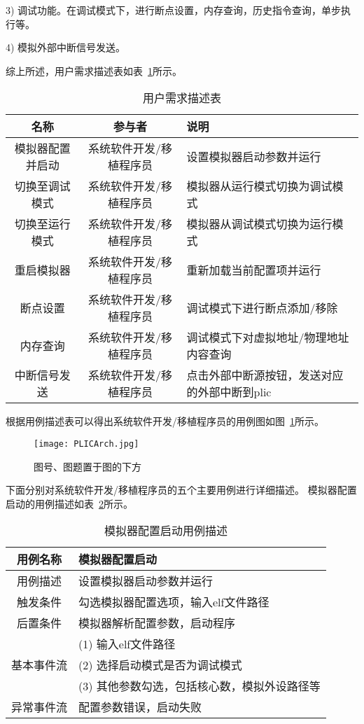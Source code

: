 3) 调试功能。在调试模式下，进行断点设置，内存查询，历史指令查询，单步执行等。


4) 模拟外部中断信号发送。


综上所述，用户需求描述表如表~\ref{tab:tab1}所示。
\begin{table}[h]
  \centering
  \caption{用户需求描述表}
  \label{tab:tab1}
  \begin{tabular}{ccl}
    \toprule
    名称   & 参与者   & 说明   \\
    \midrule
    模拟器配置并启动 & 系统软件开发/移植程序员 & \multicolumn{1}{p{5cm}}{设置模拟器启动参数并运行} \\
    切换至调试模式 &	系统软件开发/移植程序员	& \multicolumn{1}{m{5cm}}{模拟器从运行模式切换为调试模式}\\
    切换至运行模式 & 系统软件开发/移植程序员	& \multicolumn{1}{m{5cm}}{模拟器从调试模式切换为运行模式}\\
    重启模拟器	& 系统软件开发/移植程序员	& \multicolumn{1}{p{5cm}}{重新加载当前配置项并运行}\\
    断点设置 &	系统软件开发/移植程序员 &	\multicolumn{1}{p{5cm}}{调试模式下进行断点添加/移除}\\
    内存查询 &	系统软件开发/移植程序员 &	\multicolumn{1}{m{5cm}}{调试模式下对虚拟地址/物理地址内容查询}\\
    中断信号发送	& 系统软件开发/移植程序员 &	\multicolumn{1}{m{5cm}}{点击外部中断源按钮，发送对应的外部中断到plic}\\
    \bottomrule
  \end{tabular}
\end{table}


根据用例描述表可以得出系统软件开发/移植程序员的用例图如图~\ref{fig:badge}所示。


\begin{figure}[h]
  \centering
  \texttt{[image: PLICArch.jpg]}
  \caption{图号、图题置于图的下方}
  \label{fig:badge}
\end{figure}


下面分别对系统软件开发/移植程序员的五个主要用例进行详细描述。 模拟器配置启动的用例描述如表~\ref{tab:yongli1}所示。
\begin{table}[h]
  \centering
  \caption{模拟器配置启动用例描述}
  \label{tab:yongli1}
  \begin{tabular}{cl}
    \toprule
用例名称 &	模拟器配置启动\\
    \midrule
用例描述 &	设置模拟器启动参数并运行\\ \hline
触发条件 &	勾选模拟器配置选项，输入elf文件路径\\ \hline
后置条件 &	模拟器解析配置参数，启动程序\\ \hline
	& (1)	输入elf文件路径 \\
  基本事件流 & (2)	选择启动模式是否为调试模式 \\
 & (3)	其他参数勾选，包括核心数，模拟外设路径等\\ \hline
异常事件流	& 配置参数错误，启动失败\\
    \bottomrule
  \end{tabular}
\end{table}


